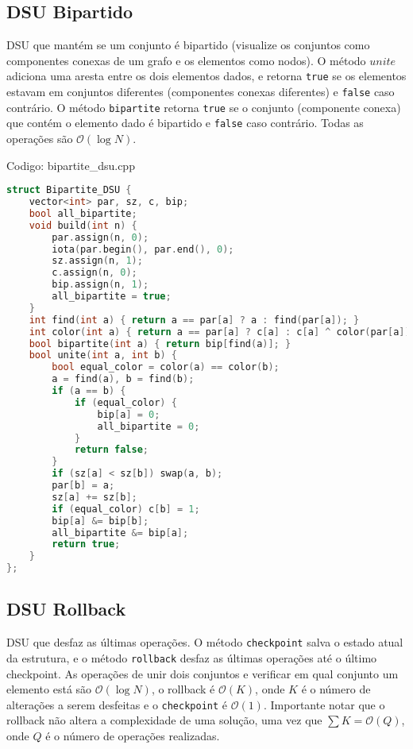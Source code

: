 \documentclass[10pt, a4paper, oneside]{book}
\begin{document}
\subsection{DSU Bipartido}


DSU que mantém se um conjunto é bipartido (visualize os conjuntos como componentes conexas de um grafo e os elementos como nodos). O método $unite$ adiciona uma aresta entre os dois elementos dados, e retorna \texttt{true} se os elementos estavam em conjuntos diferentes (componentes conexas diferentes) e \texttt{false} caso contrário. O método \texttt{bipartite} retorna \texttt{true} se o conjunto (componente conexa) que contém o elemento dado é bipartido e \texttt{false} caso contrário. Todas as operações são $\mathcal{O}(\log N)$.

\hfill

Codigo: bipartite\_dsu.cpp

\begin{lstlisting}[language=C++]
struct Bipartite_DSU {
    vector<int> par, sz, c, bip;
    bool all_bipartite;
    void build(int n) {
        par.assign(n, 0);
        iota(par.begin(), par.end(), 0);
        sz.assign(n, 1);
        c.assign(n, 0);
        bip.assign(n, 1);
        all_bipartite = true;
    }
    int find(int a) { return a == par[a] ? a : find(par[a]); }
    int color(int a) { return a == par[a] ? c[a] : c[a] ^ color(par[a]); }
    bool bipartite(int a) { return bip[find(a)]; }
    bool unite(int a, int b) {
        bool equal_color = color(a) == color(b);
        a = find(a), b = find(b);
        if (a == b) {
            if (equal_color) {
                bip[a] = 0;
                all_bipartite = 0;
            }
            return false;
        }
        if (sz[a] < sz[b]) swap(a, b);
        par[b] = a;
        sz[a] += sz[b];
        if (equal_color) c[b] = 1;
        bip[a] &= bip[b];
        all_bipartite &= bip[a];
        return true;
    }
};
\end{lstlisting}
\hfill

\subsection{DSU Rollback}


DSU que desfaz as últimas operações. O método \texttt{checkpoint} salva o estado atual da estrutura, e o método \texttt{rollback} desfaz as últimas operações até o último checkpoint. As operações de unir dois conjuntos e verificar em qual conjunto um elemento está são $\mathcal{O}(\log N)$, o rollback é $\mathcal{O}(K)$, onde $K$ é o número de alterações a serem desfeitas e o \texttt{checkpoint} é $\mathcal{O}(1)$. Importante notar que o rollback não altera a complexidade de uma solução, uma vez que $\sum K = \mathcal{O}(Q)$, onde $Q$ é o número de operações realizadas.
\end{document}
